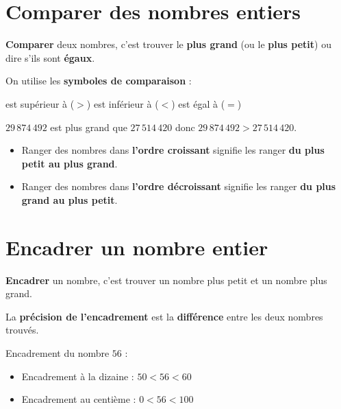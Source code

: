 \begin{pageCours}
\section{Comparer des nombres entiers}

\begin{Def}
\textbf{Comparer} deux nombres, c'est trouver le \textbf{plus grand} (ou le \textbf{plus petit}) ou dire s'ils sont \textbf{égaux}.

On utilise les \textbf{symboles de comparaison} :
\begin{center}
est supérieur à ($>$) \hspace{1cm} est inférieur à ($<$) \hspace{1cm} est égal à ($=$)
\end{center}
\end{Def}

\begin{Ex}
$29\,874\,492$ est plus grand que $27\,514\,420$ donc $29\,874\,492>27\,514\,420$.
\end{Ex}

\begin{Def}
\begin{itemize}
\item Ranger des nombres dans \textbf{l'ordre croissant} signifie les ranger \textbf{du plus petit au plus grand}.
\item Ranger des nombres dans \textbf{l'ordre décroissant} signifie les ranger \textbf{du plus grand au plus petit}.
\end{itemize}
\end{Def}


\section{Encadrer un nombre entier}

\begin{Def}
\textbf{Encadrer} un nombre, c'est trouver un nombre plus petit et un nombre plus grand.

La \textbf{précision de l'encadrement} est la \textbf{différence} entre les deux nombres trouvés.
\end{Def}

\begin{Ex}
Encadrement du nombre $56$ :
 \begin{itemize}
\item Encadrement à la dizaine : \(50 < 56< 60\)

\item Encadrement au centième : \(0 < 56< 100\)
 \end{itemize}
\end{Ex}


\end{pageCours}
